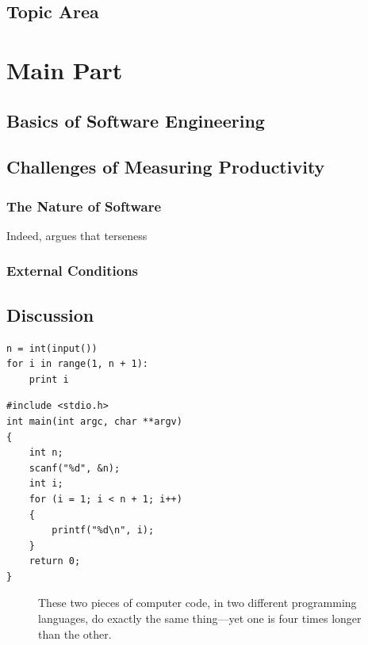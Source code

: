 \documentclass[letterpaper, 12pt]{report}
\begin{document}
\section{Topic Area}

\chapter{Main Part}
\section{Basics of Software Engineering}

\section{Challenges of Measuring Productivity}
\subsection{The Nature of Software}
Indeed, \textcite{graham:succinctness} argues that terseness

\subsection{External Conditions}

\section{Discussion}

\newsavebox{\pythonexample}
\begin{lrbox}{\pythonexample}
\begin{lstlisting}
n = int(input())
for i in range(1, n + 1):
	print i
\end{lstlisting}
\end{lrbox}

\newsavebox{\cexample}
\begin{lrbox}{\cexample}
\begin{lstlisting}
#include <stdio.h>
int main(int argc, char **argv) 
{
	int n;
	scanf("%d", &n);
	int i;
	for (i = 1; i < n + 1; i++) 
	{
		printf("%d\n", i);
	}
	return 0;
}
\end{lstlisting}
\end{lrbox}

\begin{figure}
{\caption{These two pieces of computer code, in two different programming languages, do exactly the same thing---yet one is four times longer than the other.}}
\end{figure}
\end{document}
